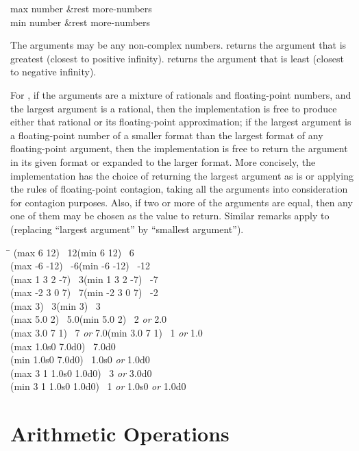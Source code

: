 \begin{defun}[Function]
max number &rest more-numbers \\
min number &rest more-numbers

The arguments may be any non-complex numbers.
 returns the argument that is greatest (closest
to positive infinity).
 returns the argument that is least (closest to
negative infinity).

For ,
if the arguments are a mixture of rationals and floating-point
numbers, and the largest argument
is a rational, then the implementation is free to
produce either that rational or its floating-point approximation;
if the largest argument is a floating-point number of a smaller format
than the largest format of any floating-point argument,
then the implementation is free to
return the argument in its given format or expanded to the larger format.
More concisely, the implementation has the choice of returning the largest
argument as is or applying the rules of floating-point contagion,
taking all the arguments into consideration for contagion purposes.
Also, if two or more of the arguments are equal, then any one
of them may be chosen as the value to return.
Similar remarks apply to  (replacing ``largest argument'' by
``smallest argument'').

\begin{lisp}
\textwidth\=\kill
(max 6 12) \EV\ 12\>(min 6 12) \EV\ 6 \\
(max -6 -12) \EV\ -6\>(min -6 -12) \EV\ -12 \\
(max 1 3 2 -7) \EV\ 3\>(min 1 3 2 -7) \EV\ -7 \\
(max -2 3 0 7) \EV\ 7\>(min -2 3 0 7) \EV\ -2 \\
(max 3) \EV\ 3\>(min 3) \EV\ 3 \\
(max 5.0 2) \EV\ 5.0\>(min 5.0 2) \EV\ 2 \emph{or} 2.0 \\
(max 3.0 7 1) \EV\ 7 \emph{or} 7.0\>(min 3.0 7 1) \EV\ 1 \emph{or} 1.0 \\
(max 1.0s0 7.0d0) \EV\ 7.0d0 \\
(min 1.0s0 7.0d0) \EV\ 1.0s0 \emph{or} 1.0d0 \\
(max 3 1 1.0s0 1.0d0) \EV\ 3 \emph{or} 3.0d0 \\
(min 3 1 1.0s0 1.0d0) \EV\ 1 \emph{or} 1.0s0 \emph{or} 1.0d0
\end{lisp}
\end{defun}

\section{Arithmetic Operations}

